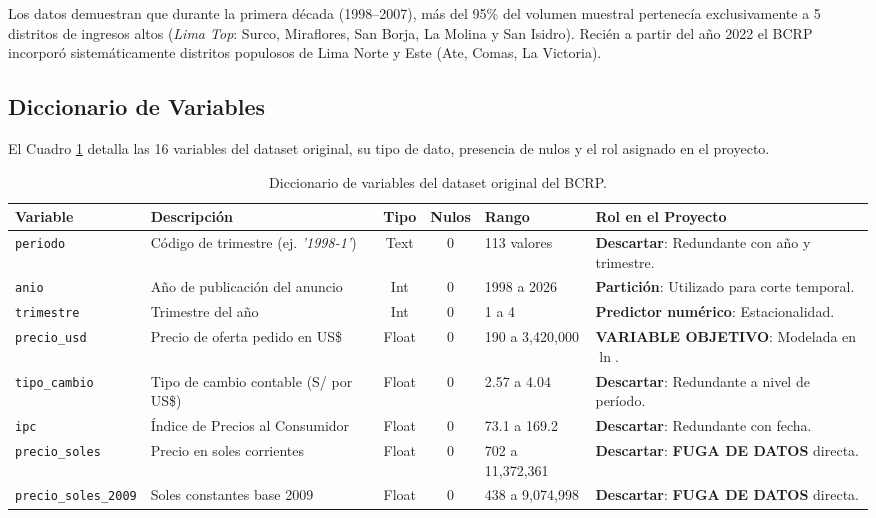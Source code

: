 \documentclass[11pt,a4paper]{article}
\begin{document}
\noindent Los datos demuestran que durante la primera década (1998--2007), más del 95\% del volumen muestral pertenecía exclusivamente a 5 distritos de ingresos altos (\textit{Lima Top}: Surco, Miraflores, San Borja, La Molina y San Isidro). Recién a partir del año 2022 el BCRP incorporó sistemáticamente distritos populosos de Lima Norte y Este (Ate, Comas, La Victoria).

\subsection{Diccionario de Variables}
El Cuadro \ref{tab:diccionario} detalla las 16 variables del dataset original, su tipo de dato, presencia de nulos y el rol asignado en el proyecto.

\begin{table}[H]
\centering
\scriptsize
\caption{Diccionario de variables del dataset original del BCRP.}
\label{tab:diccionario}
\begin{tabularx}{\textwidth}{lp{3.5cm}cclX}
\toprule
\textbf{Variable} & \textbf{Descripción} & \textbf{Tipo} & \textbf{Nulos} & \textbf{Rango} & \textbf{Rol en el Proyecto} \\
\midrule
\texttt{periodo} & Código de trimestre (ej. \textit{'1998-1'}) & Text & 0 & 113 valores & \textbf{Descartar}: Redundante con año y trimestre. \\
\texttt{anio} & Año de publicación del anuncio & Int & 0 & 1998 a 2026 & \textbf{Partición}: Utilizado para corte temporal. \\
\texttt{trimestre} & Trimestre del año & Int & 0 & 1 a 4 & \textbf{Predictor numérico}: Estacionalidad. \\
\texttt{precio\_usd} & Precio de oferta pedido en US\$ & Float & 0 & 190 a 3,420,000 & \textbf{VARIABLE OBJETIVO}: Modelada en $\ln$. \\
\texttt{tipo\_cambio} & Tipo de cambio contable (S/ por US\$) & Float & 0 & 2.57 a 4.04 & \textbf{Descartar}: Redundante a nivel de período. \\
\texttt{ipc} & Índice de Precios al Consumidor & Float & 0 & 73.1 a 169.2 & \textbf{Descartar}: Redundante con fecha. \\
\texttt{precio\_soles} & Precio en soles corrientes & Float & 0 & 702 a 11,372,361 & \textbf{Descartar}: \textbf{FUGA DE DATOS} directa. \\
\texttt{precio\_soles\_2009} & Soles constantes base 2009 & Float & 0 & 438 a 9,074,998 & \textbf{Descartar}: \textbf{FUGA DE DATOS} directa. \\

\end{tabularx}
\end{table}
\end{document}
